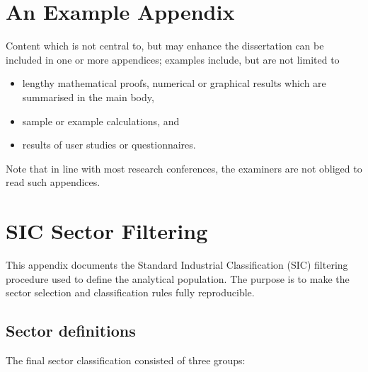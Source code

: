 \documentclass[ %
                    author={Daniel Page},
                supervisor={Dr. Andrew Calway},
                    degree={MSc},
                     title={Some Structural Guidelines for Data Science MSc Theses, Including Those With Long Titles that Run Across Multiple Lines on the Front Page},
                  subtitle={And those including an optional subtitle too, for good measure},
                      type={},
                      year={2021}]{dissertation}
\begin{document}
\backmatter





\appendix

\chapter{An Example Appendix}
\label{appx:example}

Content which is not central to, but may enhance the dissertation can be 
included in one or more appendices; examples include, but are not limited
to

\begin{itemize}
\item lengthy mathematical proofs, numerical or graphical results which 
      are summarised in the main body,
\item sample or example calculations, 
      and
\item results of user studies or questionnaires.
\end{itemize}

\noindent
Note that in line with most research conferences, the examiners are not
obliged to read such appendices.

\appendix

\chapter{SIC Sector Filtering}
\label{app:sic-filtering}

This appendix documents the Standard Industrial Classification (SIC)
filtering procedure used to define the analytical population. The purpose is
to make the sector selection and classification rules fully reproducible.

\section{Sector definitions}

The final sector classification consisted of three groups:
\end{document}
